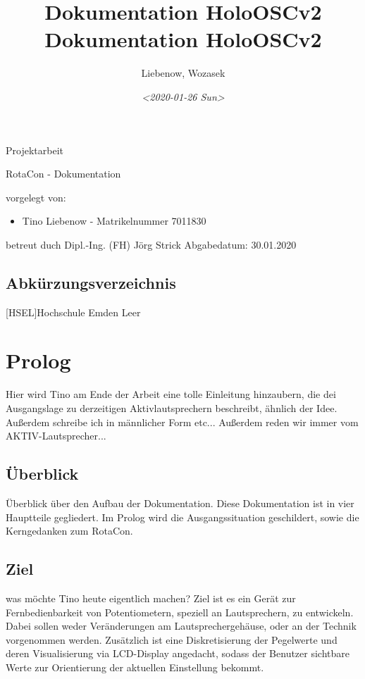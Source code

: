 \documentclass[11pt, titlepage, fleqn]{report}
\author{Liebenow, Wozasek}
\date{\textit{<2020-01-26 Sun>}}
\title{Dokumentation HoloOSCv2\\\medskip
\large Dokumentation HoloOSCv2}
\begin{document}
\begin{titlepage}%
	\hsellogo\hfill Projektarbeit %
	\par
	\vspace{4cm}
	\noindent\parbox{0.8\textwidth}{\Huge RotaCon - Dokumentation}  
	\vspace{2cm}

	\Large \noindent vorgelegt von:
	\begin{itemize}
		\item Tino Liebenow - Matrikelnummer 7011830
	\end{itemize}
	\vspace{2cm}
	betreut duch\newline
	Dipl.-Ing. (FH) Jörg Strick\newline
	Abgabedatum: 30.01.2020
\end{titlepage}
	\newpage
	\tableofcontents
	\listoffigures%
    \newpage
    \section*{\Huge Abkürzungsverzeichnis}%
    \label{sec:Abkürzungsverzeichnis}
    \vspace{1cm}
    \begin{acronym}
        [HSEL]{Hochschule Emden Leer}
    \end{acronym}
	\newpage
	\chapter{Prolog}
		Hier wird Tino am Ende der Arbeit eine tolle Einleitung hinzaubern, die dei Ausgangslage zu derzeitigen Aktivlautsprechern
		beschreibt, ähnlich der Idee. Außerdem schreibe ich in männlicher Form etc...\newline
		Außerdem reden wir immer vom AKTIV-Lautsprecher...
	\section{Überblick}
		Überblick über den Aufbau der Dokumentation.\newline
		Diese Dokumentation ist in vier Hauptteile gegliedert. Im Prolog wird die Ausgangssituation geschildert, sowie die Kerngedanken zum RotaCon.
	\section{Ziel}
		was möchte Tino heute eigentlich machen?\newline
		Ziel ist es ein Gerät zur Fernbedienbarkeit von Potentiometern, speziell an Lautsprechern, zu entwickeln. Dabei sollen weder Veränderungen
		am Lautsprechergehäuse, oder an der Technik vorgenommen werden.
		Zusätzlich ist eine Diskretisierung der Pegelwerte und deren Visualisierung via LCD-Display angedacht, sodass der Benutzer sichtbare 
		Werte zur Orientierung der aktuellen Einstellung bekommt. 
\end{document}
